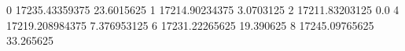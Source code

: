 0 17235.43359375 23.6015625
1 17214.90234375 3.0703125
2 17211.83203125 0.0
4 17219.208984375 7.376953125
6 17231.22265625 19.390625
8 17245.09765625 33.265625
